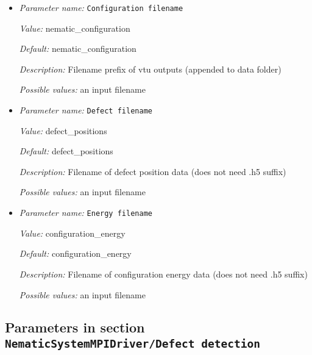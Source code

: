 \begin{itemize}
{\it Default:} nematic\_simulation


{\it Description:} Filename of archive (note: full path is necessary)


{\it Possible values:} an input filename
\item {\it Parameter name:} {\tt Configuration filename}
\label{parameters:NematicSystemMPIDriver/File output/Configuration filename}
\label{parameters:NematicSystemMPIDriver/File_20output/Configuration_20filename}


{\it Value:} nematic\_configuration


{\it Default:} nematic\_configuration


{\it Description:} Filename prefix of vtu outputs (appended to data folder)


{\it Possible values:} an input filename
\item {\it Parameter name:} {\tt Defect filename}
\label{parameters:NematicSystemMPIDriver/File output/Defect filename}
\label{parameters:NematicSystemMPIDriver/File_20output/Defect_20filename}


{\it Value:} defect\_positions


{\it Default:} defect\_positions


{\it Description:} Filename of defect position data (does not need .h5 suffix)


{\it Possible values:} an input filename
\item {\it Parameter name:} {\tt Energy filename}
\label{parameters:NematicSystemMPIDriver/File output/Energy filename}
\label{parameters:NematicSystemMPIDriver/File_20output/Energy_20filename}


{\it Value:} configuration\_energy


{\it Default:} configuration\_energy


{\it Description:} Filename of configuration energy data (does not need .h5 suffix)


{\it Possible values:} an input filename
\end{itemize}

\subsection{Parameters in section \tt NematicSystemMPIDriver/Defect detection}
\label{parameters:NematicSystemMPIDriver/Defect_20detection}

